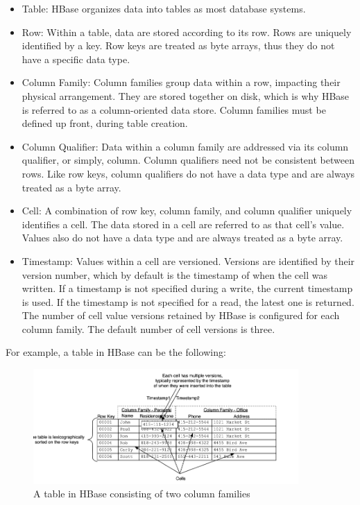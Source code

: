 \begin{itemize}
 \item Table: HBase organizes data into tables as most database systems.
 \item Row: Within a table, data are stored according to its row. Rows are uniquely identified by a key. Row keys are treated as byte arrays, thus they do not 
 have a specific data type.
 \item Column Family: Column families group data within a row, impacting their physical arrangement. They are stored together on disk, which is why 
 HBase is referred to as a column-oriented data store. Column families must be defined up front, during table creation. 
 \item Column Qualifier: Data within a column family are addressed via its column qualifier, or simply, column. Column qualifiers need not be consistent 
 between rows. Like row keys, column qualifiers do not have a data type and are always treated as a byte array.
 \item Cell: A combination of row key, column family, and column qualifier uniquely identifies a cell. The data stored in a cell are 
 referred to as that cell’s value. Values also do not have a data type and are always treated as a byte array.
 \item Timestamp: Values within a cell are versioned. Versions are identified by their version number, which by default is the timestamp of when the cell was written. 
If a timestamp is not specified during a write, the current timestamp is used. If the timestamp is not specified for a read, the latest one is returned. The number 
of cell value versions retained by HBase is configured for each column family. The default number of cell versions is three.
\end{itemize}

For example, a table in HBase can be the following:

\begin{figure}[H]
  \centering
  \includegraphics[width=0.9\textwidth]{figures/hbase.png}
  \caption{A table in HBase consisting of two column families}
\end{figure}

